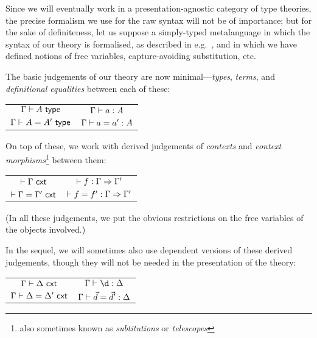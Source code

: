 \begin{para} \label{para:basic-syntax}
Since we will eventually work in a presentation-agnostic category of type theories, the precise formalism we use for the raw syntax will not be of importance; but for the sake of definiteness, let us suppose a simply-typed metalanguage in which the syntax of our theory is formalised, as described in e.g.\ \cite[6.1]{pitts:categorial-logic}, and in which we have defined notions of free variables, capture-avoiding substitution, etc.

The basic judgements of our theory are now minimal---\emph{types}, \emph{terms}, and \emph{definitional equalities} between each of these:
\end{para}
\begin{center}\begin{tabular}{@{\ }c@{\hskip 0.75in}c@{\ }}
$\Gamma \vdash A \ \mathsf{type} $ & $ \Gamma \vdash a:A $ \\ \rule{0pt}{3ex} 
$\Gamma \vdash A = A' \ \mathsf{type} $& $ \Gamma \vdash a = a' : A $ \\
\end{tabular}
\end{center}

On top of these, we work with derived judgements of \emph{contexts} and \emph{context morphisms}\footnote{also sometimes known as \emph{subtitutions} or \emph{telescopes}} between them:
\begin{center}\begin{tabular}{@{\ }c@{\hskip 0.75in}c@{\ }}
$\vdash \Gamma \ \mathsf{cxt}$ & $ \vdash  f : \Gamma \Rightarrow \Gamma' $  \\ \rule{0pt}{3ex} 
$\vdash \Gamma = \Gamma' \ \mathsf{cxt}$ &  $\vdash { f} = { f}' : \Gamma \Rightarrow \Gamma'$ \\
\end{tabular}
\end{center}

(In all these judgements, we put the obvious restrictions on the free variables of the objects involved.)

In the sequel, we will sometimes also use dependent versions of these derived judgements, though they will not be needed in the presentation of the theory:
\begin{center}\begin{tabular}{@{\ }c@{\hskip 0.75in}c@{\ }}
$ \Gamma \vdash \Delta \ \mathsf{cxt}$ & $\Gamma \types \d : \Delta $  \\ \rule{0pt}{3ex} 
$ \Gamma \vdash \Delta = \Delta' \ \mathsf{cxt}$ & $\Gamma \vdash \vec d = \vec d' : \Delta$ \\
\end{tabular}
\end{center}

